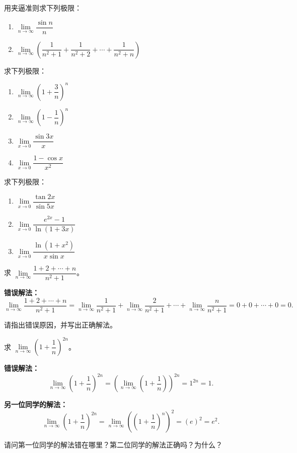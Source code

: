 \documentclass[fontset=fandol]{ctexart}
\begin{document}
\begin{exercise}用夹逼准则求下列极限：
\begin{enumerate}
\item \(\lim\limits_{n\to\infty} \dfrac{\sin n}{n}\)
\item \(\lim\limits_{n\to\infty} \left(\dfrac{1}{n^2+1} + \dfrac{1}{n^2+2} + \cdots + \dfrac{1}{n^2+n}\right)\)
\end{enumerate}
\end{exercise}

\begin{exercise}求下列极限：
\begin{enumerate}
\item \(\lim\limits_{n\to\infty} \left(1 + \dfrac{3}{n}\right)^n\)
\item \(\lim\limits_{n\to\infty} \left(1 - \dfrac{1}{n}\right)^n\)
\item \(\lim\limits_{x\to 0} \dfrac{\sin 3x}{x}\)
\item \(\lim\limits_{x\to 0} \dfrac{1 - \cos x}{x^2}\)
\end{enumerate}
\end{exercise}

\begin{exercise}求下列极限：
\begin{enumerate}
\item \(\lim\limits_{x\to 0} \dfrac{\tan 2x}{\sin 5x}\)
\item \(\lim\limits_{x\to 0} \dfrac{e^{2x} - 1}{\ln(1+3x)}\)
\item \(\lim\limits_{x\to 0} \dfrac{\ln(1 + x^2)}{x \sin x}\)
\end{enumerate}
\end{exercise}

\begin{exercise}
求 \(\lim\limits_{n\to\infty} \dfrac{1 + 2 + \cdots + n}{n^2 + 1}\)。

\textbf{错误解法：}
\[
\lim_{n\to\infty} \dfrac{1 + 2 + \cdots + n}{n^2 + 1} = \lim_{n\to\infty} \dfrac{1}{n^2+1} + \lim_{n\to\infty} \dfrac{2}{n^2+1} + \cdots + \lim_{n\to\infty} \dfrac{n}{n^2+1} = 0 + 0 + \cdots + 0 = 0.
\]

请指出错误原因，并写出正确解法。
\end{exercise}

\begin{exercise}
求 \(\lim\limits_{n\to\infty} \left(1 + \dfrac{1}{n}\right)^{2n}\)。

\textbf{错误解法：}
\[
\lim_{n\to\infty} \left(1 + \dfrac{1}{n}\right)^{2n} = \left(\lim_{n\to\infty} \left(1 + \dfrac{1}{n}\right)\right)^{2n} = 1 ^{2n}=1.
\]

\textbf{另一位同学的解法：}
\[
\lim_{n\to\infty} \left(1 + \dfrac{1}{n}\right)^{2n} = \lim_{n\to\infty} \left(\left(1 + \dfrac{1}{n}\right)^n\right)^2 = (e)^2 = e^2.
\]

请问第一位同学的解法错在哪里？第二位同学的解法正确吗？为什么？
\end{exercise}
\end{document}
